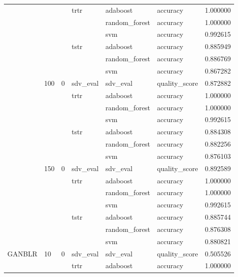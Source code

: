 \begin{longtable}{llllllr}
 &  &  & \multirow[t]{3}{*}{trtr} & adaboost & accuracy & 1.000000 \\
\cline{5-7}
 &  &  &  & random_forest & accuracy & 1.000000 \\
\cline{5-7}
 &  &  &  & svm & accuracy & 0.992615 \\
\cline{4-7} \cline{5-7}
 &  &  & \multirow[t]{3}{*}{tstr} & adaboost & accuracy & 0.885949 \\
\cline{5-7}
 &  &  &  & random_forest & accuracy & 0.886769 \\
\cline{5-7}
 &  &  &  & svm & accuracy & 0.867282 \\
\cline{2-7} \cline{3-7} \cline{4-7} \cline{5-7}
 & \multirow[t]{7}{*}{100} & \multirow[t]{7}{*}{0} & sdv_eval & sdv_eval & quality_score & 0.872882 \\
\cline{4-7} \cline{5-7}
 &  &  & \multirow[t]{3}{*}{trtr} & adaboost & accuracy & 1.000000 \\
\cline{5-7}
 &  &  &  & random_forest & accuracy & 1.000000 \\
\cline{5-7}
 &  &  &  & svm & accuracy & 0.992615 \\
\cline{4-7} \cline{5-7}
 &  &  & \multirow[t]{3}{*}{tstr} & adaboost & accuracy & 0.884308 \\
\cline{5-7}
 &  &  &  & random_forest & accuracy & 0.882256 \\
\cline{5-7}
 &  &  &  & svm & accuracy & 0.876103 \\
\cline{2-7} \cline{3-7} \cline{4-7} \cline{5-7}
 & \multirow[t]{7}{*}{150} & \multirow[t]{7}{*}{0} & sdv_eval & sdv_eval & quality_score & 0.892589 \\
\cline{4-7} \cline{5-7}
 &  &  & \multirow[t]{3}{*}{trtr} & adaboost & accuracy & 1.000000 \\
\cline{5-7}
 &  &  &  & random_forest & accuracy & 1.000000 \\
\cline{5-7}
 &  &  &  & svm & accuracy & 0.992615 \\
\cline{4-7} \cline{5-7}
 &  &  & \multirow[t]{3}{*}{tstr} & adaboost & accuracy & 0.885744 \\
\cline{5-7}
 &  &  &  & random_forest & accuracy & 0.876308 \\
\cline{5-7}
 &  &  &  & svm & accuracy & 0.880821 \\
\cline{1-7} \cline{2-7} \cline{3-7} \cline{4-7} \cline{5-7}
\multirow[t]{70}{*}{GANBLR} & \multirow[t]{14}{*}{10} & \multirow[t]{7}{*}{0} & sdv_eval & sdv_eval & quality_score & 0.505526 \\
\cline{4-7} \cline{5-7}
 &  &  & \multirow[t]{3}{*}{trtr} & adaboost & accuracy & 1.000000 \\

\end{longtable}
